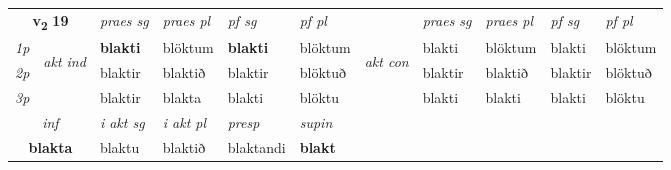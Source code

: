 \noindent
\begin{tabular}{lllllllllll} \toprule
\multicolumn{2}{c}{\textbf{v{\textsubscript{2}}} \Large{\textbf{19}}}  &  \textit{praes sg}  & \textit{praes pl}  &\textit{ pf sg} & \textit{pf pl} &  &  \textit{praes sg}  & \textit{praes pl}  & \textit{pf sg} & \textit{pf pl } \\*
	\cmidrule{3-6} \cmidrule{8-11}
 {\textit{1p}} & \multirow{3}{*}{\begin{turn}{90}\textit{akt ind}\end{turn}} & \textbf{blakti} & blöktum & \textbf{blakti} & blöktum & \multirow{3}{*}{\begin{turn}{90}\textit{akt con}\end{turn}} &blakti & blöktum & blakti & blöktum\\*
 {\textit{2p}} &  &  blaktir  & blaktið & blaktir & blöktuð & & blaktir & blaktið & blaktir & blöktuð \\*
{\textit{3p}} &  & blaktir & blakta & blakti & blöktu & & blakti & blakti& blakti & blöktu \\*
\cmidrule{3-6} \cmidrule{8-11}

   \multicolumn{2}{c}{\textit{inf}}  & \textit{i akt sg} & \textit{i akt pl}   & \textit{presp} & \textit{supin}   \\*
  \multicolumn{2}{c}{\textbf{blakta}} & blaktu  & blaktið   & blaktandi &  \textbf{blakt}   \\*
\end{tabular}

